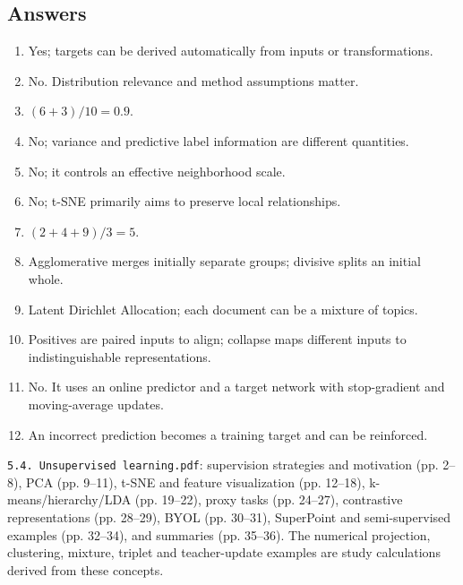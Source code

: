 \documentclass[11pt]{article}
\begin{document}
\subsection{Answers}
\begin{enumerate}
\item Yes; targets can be derived automatically from inputs or transformations.
\item No. Distribution relevance and method assumptions matter.
\item $(6+3)/10=0.9$.
\item No; variance and predictive label information are different quantities.
\item No; it controls an effective neighborhood scale.
\item No; t-SNE primarily aims to preserve local relationships.
\item $(2+4+9)/3=5$.
\item Agglomerative merges initially separate groups; divisive splits an initial whole.
\item Latent Dirichlet Allocation; each document can be a mixture of topics.
\item Positives are paired inputs to align; collapse maps different inputs to indistinguishable representations.
\item No. It uses an online predictor and a target network with stop-gradient and moving-average updates.
\item An incorrect prediction becomes a training target and can be reinforced.
\end{enumerate}

\texttt{5.4. Unsupervised learning.pdf}: supervision strategies and motivation (pp. 2--8), PCA (pp. 9--11), t-SNE and feature visualization (pp. 12--18), k-means/hierarchy/LDA (pp. 19--22), proxy tasks (pp. 24--27), contrastive representations (pp. 28--29), BYOL (pp. 30--31), SuperPoint and semi-supervised examples (pp. 32--34), and summaries (pp. 35--36). The numerical projection, clustering, mixture, triplet and teacher-update examples are study calculations derived from these concepts.
\end{document}
